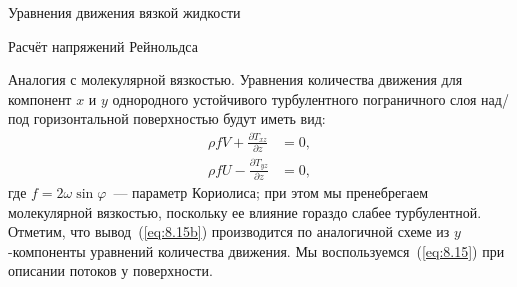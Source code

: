 \begin{chapter}{Уравнения движения вязкой жидкости}
\begin{section}{Расчёт напряжений Рейнольдса}
\begin{paragraph}{Аналогия с молекулярной вязкостью.}
Уравнения количества движения для компонент $x$ и $y$ однородного 
устойчивого турбулентного пограничного слоя над/под горизонтальной 
поверхностью будут иметь вид:
\begin{subequations}\label{eq:8.15}
\begin{align}
\rho fV + \frac{\partial {T_{xz}}}{\partial z} & = 0, \\
\rho fU - \frac{\partial {T_{yz}}}{\partial z} & = 0, \label{eq:8.15b}
\end{align}
\end{subequations}
где $f=2\omega \sin \varphi$~--- параметр Кориолиса; при этом мы пренебрегаем
молекулярной вязкостью, поскольку ее влияние гораздо слабее турбулентной.
Отметим, что вывод~(\ref{eq:8.15b}) производится по аналогичной схеме
из $y$-компоненты уравнений количества движения. 
Мы воспользуемся~(\ref{eq:8.15}) при описании потоков у поверхности.
%


\end{paragraph}
\end{section}
\end{chapter}
